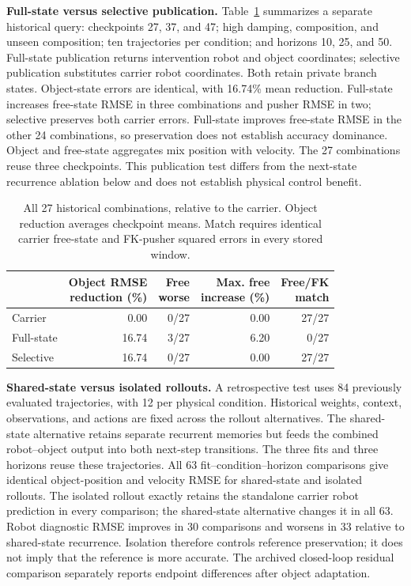 \documentclass[conference]{IEEEtran}
\begin{document}
\textbf{Full-state versus selective publication.} Table~\ref{tab:historical-publication} summarizes a separate historical query: checkpoints 27, 37, and 47; high damping, composition, and unseen composition; ten trajectories per condition; and horizons 10, 25, and 50. Full-state publication returns intervention robot and object coordinates; selective publication substitutes carrier robot coordinates. Both retain private branch states. Object-state errors are identical, with 16.74\% mean reduction. Full-state increases free-state RMSE in three combinations and pusher RMSE in two; selective preserves both carrier errors. Full-state improves free-state RMSE in the other 24 combinations, so preservation does not establish accuracy dominance. Object and free-state aggregates mix position with velocity. The 27 combinations reuse three checkpoints. This publication test differs from the next-state recurrence ablation below and does not establish physical control benefit.

\begin{table}[t]\centering\small
\caption{All 27 historical combinations, relative to the carrier. Object reduction averages checkpoint means. Match requires identical carrier free-state and FK-pusher squared errors in every stored window.}
\label{tab:historical-publication}
\setlength{\tabcolsep}{3pt}
\begin{tabular}{lrrrr}\toprule
& \shortstack{Object RMSE\\reduction (\%)} & \shortstack{Free\\worse} & \shortstack{Max. free\\increase (\%)} & \shortstack{Free/FK\\match}\\\midrule
Carrier & 0.00 & 0/27 & 0.00 & 27/27\\
Full-state & 16.74 & 3/27 & 6.20 & 0/27\\
Selective & 16.74 & 0/27 & 0.00 & 27/27\\
\bottomrule\end{tabular}\end{table}

\textbf{Shared-state versus isolated rollouts.} A retrospective test uses 84 previously evaluated trajectories, with 12 per physical condition. Historical weights, context, observations, and actions are fixed across the rollout alternatives. The shared-state alternative retains separate recurrent memories but feeds the combined robot--object output into both next-step transitions. The three fits and three horizons reuse these trajectories. All 63 fit--condition--horizon comparisons give identical object-position and velocity RMSE for shared-state and isolated rollouts. The isolated rollout exactly retains the standalone carrier robot prediction in every comparison; the shared-state alternative changes it in all 63. Robot diagnostic RMSE improves in 30 comparisons and worsens in 33 relative to shared-state recurrence. Isolation therefore controls reference preservation; it does not imply that the reference is more accurate. The archived closed-loop residual comparison separately reports endpoint differences after object adaptation.
\end{document}
